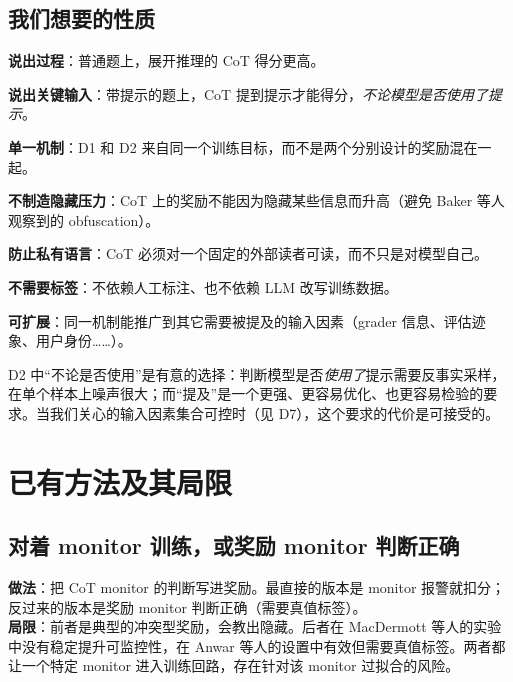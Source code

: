 \documentclass[11pt,a4paper]{ctexart}
\begin{document}
\subsection{我们想要的性质}
\begin{description}[leftmargin=2.2em,labelwidth=2em]
\item[D1] \textbf{说出过程}：普通题上，展开推理的 CoT 得分更高。
\item[D2] \textbf{说出关键输入}：带提示的题上，CoT 提到提示才能得分，\emph{不论模型是否使用了提示}。
\item[D3] \textbf{单一机制}：D1 和 D2 来自同一个训练目标，而不是两个分别设计的奖励混在一起。
\item[D4] \textbf{不制造隐藏压力}：CoT 上的奖励不能因为隐藏某些信息而升高（避免 Baker 等人观察到的 obfuscation）。
\item[D5] \textbf{防止私有语言}：CoT 必须对一个固定的外部读者可读，而不只是对模型自己。
\item[D6] \textbf{不需要标签}：不依赖人工标注、也不依赖 LLM 改写训练数据。
\item[D7] \textbf{可扩展}：同一机制能推广到其它需要被提及的输入因素（grader 信息、评估迹象、用户身份……）。
\end{description}

D2 中“不论是否使用”是有意的选择：判断模型是否\emph{使用了}提示需要反事实采样，在单个样本上噪声很大；而“提及”是一个更强、更容易优化、也更容易检验的要求。当我们关心的输入因素集合可控时（见 D7），这个要求的代价是可接受的。

\section{已有方法及其局限}
\label{sec:related}

\subsection{对着 monitor 训练，或奖励 monitor 判断正确}
\textbf{做法}：把 CoT monitor 的判断写进奖励。最直接的版本是 monitor 报警就扣分\cite{baker2025}；反过来的版本是奖励 monitor 判断正确（需要真值标签）\cite{macdermott2025,anwar2026a}。\\
\textbf{局限}：前者是典型的冲突型奖励，会教出隐藏\cite{baker2025,kaufmann2026}。后者在 MacDermott 等人的实验中没有稳定提升可监控性\cite{macdermott2025}，在 Anwar 等人的设置中有效但需要真值标签\cite{anwar2026a}。两者都让一个特定 monitor 进入训练回路，存在针对该 monitor 过拟合的风险。
\end{document}
